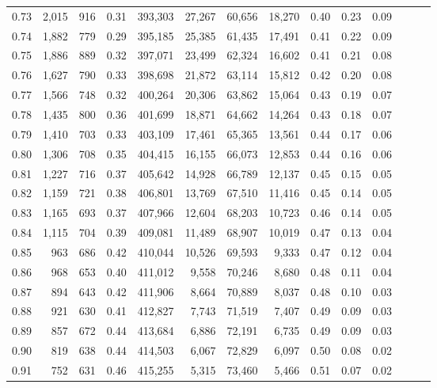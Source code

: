 \begin{tabular}{rrrrrrrrrrrrrr}
0.73 &  2,015 &    916 &  0.31 &  393,303 &   27,267 &  60,656 &  18,270 &  0.40 &  0.23 &      0.09 \\
0.74 &  1,882 &    779 &  0.29 &  395,185 &   25,385 &  61,435 &  17,491 &  0.41 &  0.22 &      0.09 \\
0.75 &  1,886 &    889 &  0.32 &  397,071 &   23,499 &  62,324 &  16,602 &  0.41 &  0.21 &      0.08 \\
0.76 &  1,627 &    790 &  0.33 &  398,698 &   21,872 &  63,114 &  15,812 &  0.42 &  0.20 &      0.08 \\
0.77 &  1,566 &    748 &  0.32 &  400,264 &   20,306 &  63,862 &  15,064 &  0.43 &  0.19 &      0.07 \\
0.78 &  1,435 &    800 &  0.36 &  401,699 &   18,871 &  64,662 &  14,264 &  0.43 &  0.18 &      0.07 \\
0.79 &  1,410 &    703 &  0.33 &  403,109 &   17,461 &  65,365 &  13,561 &  0.44 &  0.17 &      0.06 \\
0.80 &  1,306 &    708 &  0.35 &  404,415 &   16,155 &  66,073 &  12,853 &  0.44 &  0.16 &      0.06 \\
0.81 &  1,227 &    716 &  0.37 &  405,642 &   14,928 &  66,789 &  12,137 &  0.45 &  0.15 &      0.05 \\
0.82 &  1,159 &    721 &  0.38 &  406,801 &   13,769 &  67,510 &  11,416 &  0.45 &  0.14 &      0.05 \\
0.83 &  1,165 &    693 &  0.37 &  407,966 &   12,604 &  68,203 &  10,723 &  0.46 &  0.14 &      0.05 \\
0.84 &  1,115 &    704 &  0.39 &  409,081 &   11,489 &  68,907 &  10,019 &  0.47 &  0.13 &      0.04 \\
0.85 &    963 &    686 &  0.42 &  410,044 &   10,526 &  69,593 &   9,333 &  0.47 &  0.12 &      0.04 \\
0.86 &    968 &    653 &  0.40 &  411,012 &    9,558 &  70,246 &   8,680 &  0.48 &  0.11 &      0.04 \\
0.87 &    894 &    643 &  0.42 &  411,906 &    8,664 &  70,889 &   8,037 &  0.48 &  0.10 &      0.03 \\
0.88 &    921 &    630 &  0.41 &  412,827 &    7,743 &  71,519 &   7,407 &  0.49 &  0.09 &      0.03 \\
0.89 &    857 &    672 &  0.44 &  413,684 &    6,886 &  72,191 &   6,735 &  0.49 &  0.09 &      0.03 \\
0.90 &    819 &    638 &  0.44 &  414,503 &    6,067 &  72,829 &   6,097 &  0.50 &  0.08 &      0.02 \\
0.91 &    752 &    631 &  0.46 &  415,255 &    5,315 &  73,460 &   5,466 &  0.51 &  0.07 &      0.02 \\

\end{tabular}
